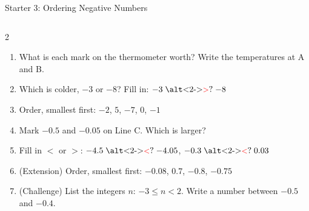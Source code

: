 \documentclass{beamer}
\newcommand{\ashow}[1]{\uncover<2->{\textcolor{red}{\small #1}}}
\newcommand{\ashowq}[1]{\alt<2->{\textcolor{red}{\small #1}}{?}}
\begin{document}
\begin{frame}{Starter 3: Ordering Negative Numbers}
\begin{columns}[T]
\begin{multicols}{2}
\begin{enumerate}
  \item What is each mark on the thermometer worth? Write the temperatures at A and B. \ashow{$2\,^\circ$C per mark; A $=-6$, B $=4$}

  \item Which is colder, $-3$ or $-8$? Fill in: $-3 \mathrel{\text{\ashowq{$>$}}} -8$ \ashow{($-8$ is colder)}

  \item Order, smallest first: $-2$, $5$, $-7$, $0$, $-1$ \ashow{($-7,-2,-1,0,5$)}

  \columnbreak

  \item Mark $-0.5$ and $-0.05$ on Line C. Which is larger? \ashow{$-0.05$}

  \item Fill in $<$ or $>$: $-4.5 \mathrel{\text{\ashowq{$<$}}} -4.05$, $-0.3 \mathrel{\text{\ashowq{$<$}}} 0.03$

  \item (Extension) Order, smallest first: $-0.08$, $0.7$, $-0.8$, $-0.75$ \ashow{($-0.8$, $-0.75$, $-0.08$, $0.7$)}

  \item (Challenge) List the integers $n$: $-3\leq n<2$. Write a number between $-0.5$ and $-0.4$. \ashow{$-3,-2,-1,0,1$; e.g.\ $-0.45$}

\end{enumerate}
\end{multicols}

\end{columns}

\end{frame}
\end{document}
